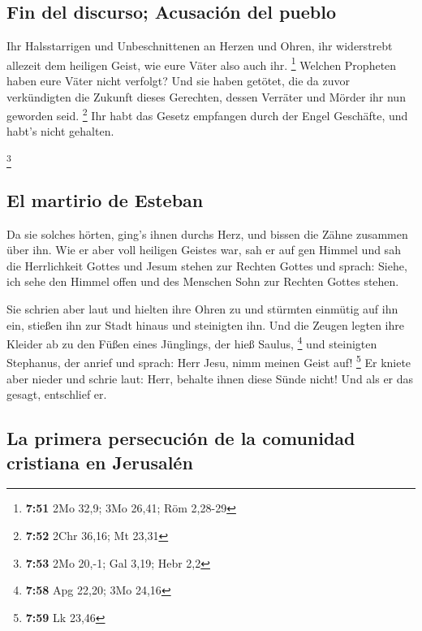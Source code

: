 \hypertarget{fin-del-discurso-acusaciuxf3n-del-pueblo}{%
\subsection{Fin del discurso; Acusación del
pueblo}\label{fin-del-discurso-acusaciuxf3n-del-pueblo}}

 Ihr Halsstarrigen und Unbeschnittenen an Herzen und
Ohren, ihr widerstrebt allezeit dem heiligen Geist, wie eure Väter also
auch ihr. \footnote{\textbf{7:51} 2Mo 32,9; 3Mo 26,41; Röm 2,28-29}
 Welchen Propheten haben eure Väter nicht verfolgt? Und
sie haben getötet, die da zuvor verkündigten die Zukunft dieses
Gerechten, dessen Verräter und Mörder ihr nun geworden seid. \footnote{\textbf{7:52}
  2Chr 36,16; Mt 23,31}  Ihr habt das Gesetz empfangen
durch der Engel Geschäfte, und habt's nicht gehalten.

\footnote{\textbf{7:53} 2Mo 20,-1; Gal 3,19; Hebr 2,2}

\hypertarget{el-martirio-de-esteban}{%
\subsection{El martirio de Esteban}\label{el-martirio-de-esteban}}

 Da sie solches hörten, ging's ihnen durchs Herz, und
bissen die Zähne zusammen über ihn.  Wie er aber voll
heiligen Geistes war, sah er auf gen Himmel und sah die Herrlichkeit
Gottes und Jesum stehen zur Rechten Gottes  und sprach:
Siehe, ich sehe den Himmel offen und des Menschen Sohn zur Rechten
Gottes stehen.

 Sie schrien aber laut und hielten ihre Ohren zu und
stürmten einmütig auf ihn ein, stießen ihn zur Stadt hinaus und
steinigten ihn.  Und die Zeugen legten ihre Kleider ab zu
den Füßen eines Jünglings, der hieß Saulus, \footnote{\textbf{7:58} Apg
  22,20; 3Mo 24,16}  und steinigten Stephanus, der anrief
und sprach: Herr Jesu, nimm meinen Geist auf! \footnote{\textbf{7:59} Lk
  23,46}  Er kniete aber nieder und schrie laut: Herr,
behalte ihnen diese Sünde nicht! Und als er das gesagt, entschlief er.

\hypertarget{la-primera-persecuciuxf3n-de-la-comunidad-cristiana-en-jerusaluxe9n}{%
\subsection{La primera persecución de la comunidad cristiana en
Jerusalén}\label{la-primera-persecuciuxf3n-de-la-comunidad-cristiana-en-jerusaluxe9n}}

